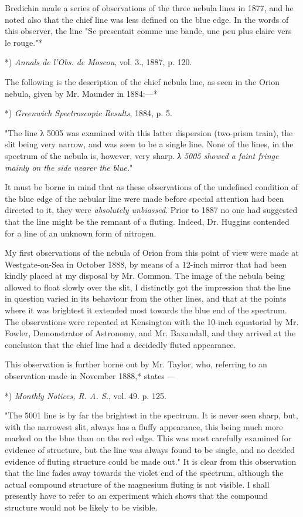 \documentclass[a4paper, 12pt, oneside, polutonikogreek, english]{article}
\begin{document}
Bredichin made a series of observations of the three nebula lines in 1877, and he noted also that the chief line was less defined on the blue edge. In the words of this observer, the line "Se presentait comme une bande, une peu plus claire vers le rouge."*

*) \emph{Annals de l'Obs. de Moscou}, vol. 3., 1887, p. 120.

The following is the description of the chief nebula line, as seen in the Orion nebula, given by Mr. Maunder in 1884:---*

*) \emph{Greenwich Spectroscopic Results}, 1884, p. 5.

"The line λ 5005 was examined with this latter dispersion (two-prism train), the slit being very narrow, and was seen to be a single line. None of the lines, in the spectrum of the nebula is, however, very sharp. \emph{λ 5005 showed a faint fringe mainly on the side nearer the blue.}"

It must be borne in mind that as these observations of the undefined condition of the blue edge of the nebular line were made before special attention had been directed to it, they were \emph{absolutely unbiassed}. Prior to 1887 no one had suggested that the line might be the remnant of a fluting. Indeed, Dr. Huggins contended for a line of an unknown form of nitrogen.

My first observations of the nebula of Orion from this point of view were made at Westgate-on-Sea in October 1888, by means of a 12-inch mirror that had been kindly placed at my disposal by Mr. Common. The image of the nebula being allowed to float slowly over the slit, I distinctly got the impression that the line in question varied in its behaviour from the other lines, and that at the points where it was brightest it extended most towards the blue end of the spectrum. The observations were repeated at Kensington with the 10-inch equatorial by Mr. Fowler, Demonstrator of Astronomy, and Mr. Baxandall, and they arrived at the conclusion that the chief line had a decidedly fluted appearance.

This observation is further borne out by Mr. Taylor, who, referring to an observation made in November 1888,* states ---

*) \emph{Monthly Notices, R. A. S.}, vol. 49. p. 125.

"The 5001 line is by far the brightest in the spectrum. It is never seen sharp, but, with the narrowest slit, always has a fluffy appearance, this being much more marked on the blue than on the red edge. This was most carefully examined for evidence of structure, but the line was always found to be single, and no decided evidence of fluting structure could be made out." It is clear from this observation that the line fades away towards the violet end of the spectrum, although the actual compound structure of the magnesium fluting is not visible. I shall presently have to refer to an experiment which shows that the compound structure would not be likely to be visible.
\end{document}
